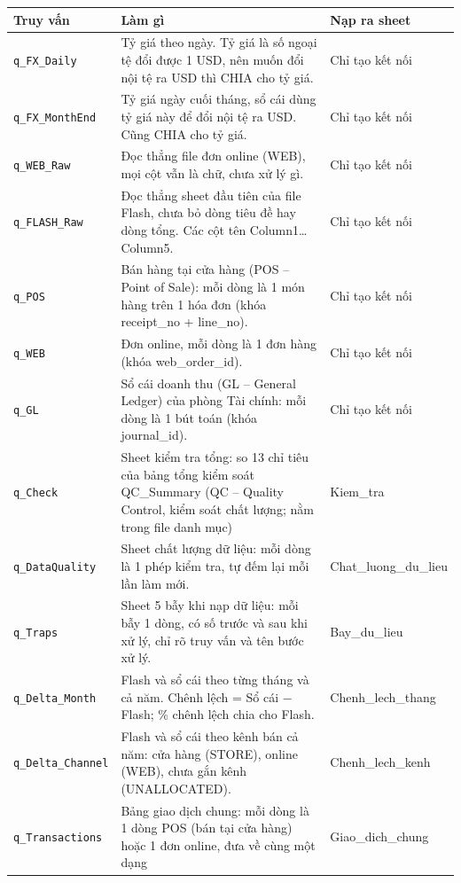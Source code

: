 {\scriptsize
\begin{longtable}{@{}L{3.1cm} L{9.0cm} L{3.0cm}@{}}
\toprule
Truy vấn & Làm gì & Nạp ra sheet \\
\midrule
\endhead
\texttt{q\_FX\_Daily} & Tỷ giá theo ngày. Tỷ giá là số ngoại tệ đổi được 1 USD, nên muốn đổi nội tệ ra USD thì CHIA cho tỷ giá. & Chỉ tạo kết nối \\
\texttt{q\_FX\_MonthEnd} & Tỷ giá ngày cuối tháng, sổ cái dùng tỷ giá này để đổi nội tệ ra USD. Cũng CHIA cho tỷ giá. & Chỉ tạo kết nối \\
\texttt{q\_WEB\_Raw} & Đọc thẳng file đơn online (WEB), mọi cột vẫn là chữ, chưa xử lý gì. & Chỉ tạo kết nối \\
\texttt{q\_FLASH\_Raw} & Đọc thẳng sheet đầu tiên của file Flash, chưa bỏ dòng tiêu đề hay dòng tổng. Các cột tên Column1\ldots{}Column5. & Chỉ tạo kết nối \\
\texttt{q\_POS} & Bán hàng tại cửa hàng (POS – Point of Sale): mỗi dòng là 1 món hàng trên 1 hóa đơn (khóa receipt\_no + line\_no). & Chỉ tạo kết nối \\
\texttt{q\_WEB} & Đơn online, mỗi dòng là 1 đơn hàng (khóa web\_order\_id). & Chỉ tạo kết nối \\
\texttt{q\_GL} & Sổ cái doanh thu (GL – General Ledger) của phòng Tài chính: mỗi dòng là 1 bút toán (khóa journal\_id). & Chỉ tạo kết nối \\
\texttt{q\_Check} & Sheet kiểm tra tổng: so 13 chỉ tiêu của bảng tổng kiểm soát QC\_Summary (QC – Quality Control, kiểm soát chất lượng; nằm trong file danh mục) & Kiem\_tra \\
\texttt{q\_DataQuality} & Sheet chất lượng dữ liệu: mỗi dòng là 1 phép kiểm tra, tự đếm lại mỗi lần làm mới. & Chat\_luong\_du\_lieu \\
\texttt{q\_Traps} & Sheet 5 bẫy khi nạp dữ liệu: mỗi bẫy 1 dòng, có số trước và sau khi xử lý, chỉ rõ truy vấn và tên bước xử lý. & Bay\_du\_lieu \\
\texttt{q\_Delta\_Month} & Flash và sổ cái theo từng tháng và cả năm. Chênh lệch = Sổ cái $-$ Flash; \% chênh lệch chia cho Flash. & Chenh\_lech\_thang \\
\texttt{q\_Delta\_Channel} & Flash và sổ cái theo kênh bán cả năm: cửa hàng (STORE), online (WEB), chưa gắn kênh (UNALLOCATED). & Chenh\_lech\_kenh \\
\texttt{q\_Transactions} & Bảng giao dịch chung: mỗi dòng là 1 dòng POS (bán tại cửa hàng) hoặc 1 đơn online, đưa về cùng một dạng & Giao\_dich\_chung \\

\end{longtable}}

